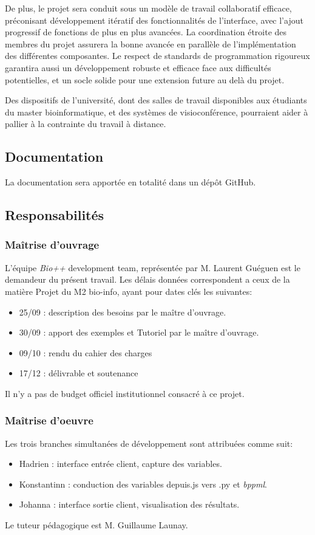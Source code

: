 De plus, le projet sera conduit
sous un modèle de travail collaboratif efficace,
préconisant développement itératif des fonctionnalités de l'interface,
avec l'ajout progressif de fonctions de plus en plus avancées.
La coordination étroite des membres du projet
assurera la bonne avancée en parallèle de l'implémentation des différentes composantes.
Le respect de standards de programmation rigoureux
garantira aussi un développement robuste et efficace face aux difficultés potentielles,
et un socle solide pour une extension future au delà du projet.

Des dispositifs de l'université,
dont des salles de travail disponibles aux étudiants du master bioinformatique,
et des systèmes de visioconférence,
pourraient aider à pallier à la contrainte du travail à distance.

 
\subsection{Documentation} 
La documentation sera apportée en totalité dans un dépôt GitHub.

	
\subsection{Responsabilités}
\subsubsection{Maîtrise d'ouvrage}
L'équipe \textit{Bio++} development team, représentée par M. Laurent Guéguen est le
 demandeur du présent travail. Les délais données correspondent a ceux de la matière 
 Projet du M2 bio-info, ayant pour dates clés les suivantes:
\begin{itemize}
	\item 25/09 : description des besoins par le maître d'ouvrage.
	\item 30/09 : apport des exemples et Tutoriel par le maître d'ouvrage.
	\item 09/10 : rendu du cahier des charges 
	\item 17/12 : délivrable et soutenance 
\end{itemize}
Il n'y a pas de budget officiel institutionnel consacré à ce projet. 

\subsubsection{Maîtrise d'oeuvre}

Les trois branches simultanées de développement sont attribuées comme suit:

\begin{itemize}
	\item Hadrien : interface entrée client, capture des variables.
	\item Konstantinn : conduction des variables depuis.js vers .py et \textit{bppml}.
	\item Johanna : interface sortie client, visualisation des résultats.
\end{itemize}


Le tuteur pédagogique est M. Guillaume Launay.

%
